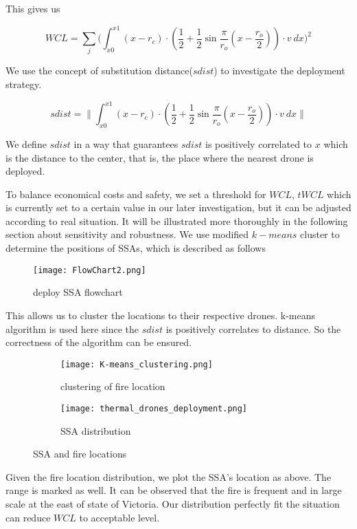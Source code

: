 \documentclass[../main]{subfiles}
\begin{document}
This gives us

\begin{equation}
WCL=\sum_j \Bigg(\int _{x0} ^{x1}  { (x-r_c)\cdot (\frac 1 2 + \frac 1 2 \sin \frac {\pi} {r_o}(x-\frac {r_o} {2} ))} \cdot  v  \  dx \Bigg)^2
\end{equation}

We use the concept of substitution distance(\(sdist\)) to investigate
the deployment strategy.

\begin{equation}
sdist=\Bigg\| \int _{x0} ^{x1}  { (x-r_c)\cdot (\frac 1 2 + \frac 1 2 \sin \frac {\pi} {r_o}(x-\frac {r_o} {2} ))} \cdot  v  \  dx \Bigg\|
\end{equation}

We define \(sdist\) in a way that guarantees \(sdist\) is positively
correlated to \(x\) which is the distance to the center, that is, the
place where the nearest drone is deployed.

To balance economical costs and safety, we set a threshold for \(WCL\),
\(tWCL\) which is currently set to a certain value in our later
investigation, but it can be adjusted according to real situation. It
will be illustrated more thoroughly in the following section about
sensitivity and robustness. We use modified \(k-means\) cluster to
determine the positions of SSAs, which is described as follows
\begin{figure}[h!]
      \texttt{[image: FlowChart2.png]}
      \caption{deploy SSA flowchart}
    \end{figure}
This allows us to cluster the locations to their respective drones.
k-means algorithm is used here since the \(sdist\) is positively
correlates to distance. So the correctness of the algorithm can be
ensured.
\begin{figure}[h!]
      \centering
      \begin{subfigure}[b]{0.4\linewidth}
        \texttt{[image: K-means\_clustering.png]}
        \caption{clustering of fire location}
      \end{subfigure}
      \begin{subfigure}[b]{0.4\linewidth}
        \texttt{[image: thermal\_drones\_deployment.png]}
        \caption{SSA distribution}
      \end{subfigure}
      \caption{SSA and fire locations}
      \label{fig:coffee}
    \end{figure}
Given the fire location distribution, we plot the SSA's location as
above. The range is marked as well. It can be observed that the fire is
frequent and in large scale at the east of state of Victoria. Our
distribution perfectly fit the situation can reduce \(WCL\) to
acceptable level.
\end{document}
